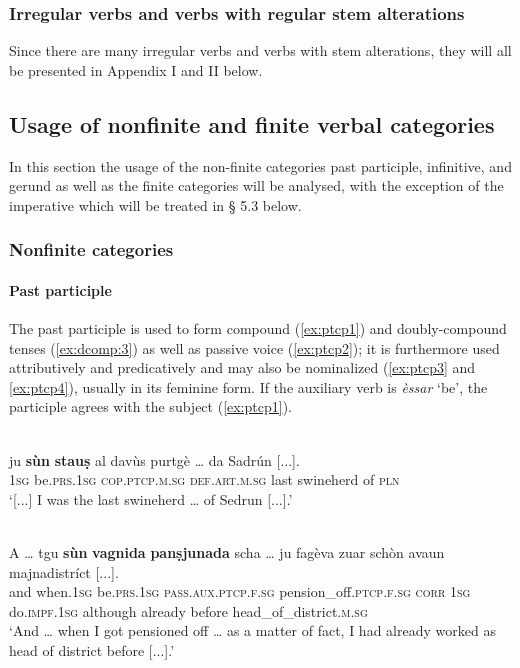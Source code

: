 


\subsubsection{Irregular verbs and verbs with regular stem alterations}
Since there are many irregular verbs and verbs with stem alterations, they will all be presented in Appendix I and II below. 

\subsection{Usage of nonfinite and finite verbal categories}
In this section the usage of the non-finite categories past participle, infinitive, and gerund as well as the finite categories will be analysed, with the exception of the imperative which will be treated in § 5.3 below.

\subsubsection{Nonfinite categories}

\paragraph{Past participle}


The past participle is used to form compound (\ref{ex:ptcp1}) and doubly-compound tenses (\ref{ex:dcomp:3}) as well as passive voice (\ref{ex:ptcp2}); it is furthermore used attributively and predicatively and may also be nominalized (\ref{ex:ptcp3} and \ref{ex:ptcp4}), usually in its feminine form. If the auxiliary verb is \textit{èssar} `be', the participle agrees with the subject (\ref{ex:ptcp1}).

\ea
\label{ex:ptcp1}
\\
\gll    [...] ju \textbf{sùn} \textbf{stauṣ} al davùs purtgè … da Sadrún [...].\\
{}  \textsc{1sg} be.\textsc{prs.1sg} \textsc{cop.ptcp.m.sg} \textsc{def.art.m.sg} last swineherd {} of \textsc{pln} \\
\glt `[...] I was the last swineherd … of Sedrun [...].'
\z

\ea\label{ex:ptcp2}
\\
\gll  A … tgu \textbf{sùn} \textbf{vagnida} \textbf{panṣjunada} scha … ju fagèva zuar schòn avaun majnadistríct [...].\\
and {} when.\textsc{1sg} be.\textsc{prs.1sg} \textsc{pass.aux.ptcp.f.sg} pension\_off.\textsc{ptcp.f.sg} \textsc{corr} {} \textsc{1sg} do.\textsc{impf.1sg} although already before head\_of\_district.\textsc{m.sg}\\
\glt `And … when I got pensioned off … as a matter of fact, I had already worked as head of district before [...].'
\z

